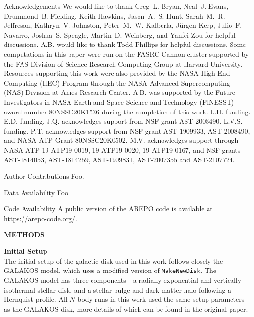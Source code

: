 \documentclass{natureprintstyle}
\newcommand{\Nbody}{$N$-body}
\begin{document}
\begin{addendum}
  
\item [Acknowledgements] We would like to thank Greg~L. Bryan, Neal~J. Evans,
Drummond~B. Fielding, Keith Hawkins, Jason~A.~S. Hunt, Sarah~M.~R. Jeffreson,
Kathryn~V. Johnston, Peter~M.~W. Kalberla, Jürgen Kerp, Julio~F. Navarro,
Joshua~S. Speagle, Martin~D. Weinberg, and Yanfei Zou for helpful discussions.
A.B. would like to thank Todd Phillips for helpful discussions. Some
computations in this paper were run on the FASRC Cannon cluster supported by
the FAS Division of Science Research Computing Group at Harvard University.
Resources supporting this work were also provided by the NASA High-End
Computing (HEC) Program through the NASA Advanced Supercomputing (NAS)
Division at Ames Research Center. A.B. was supported by the Future
Investigators in NASA Earth and Space Science and Technology (FINESST) award
number 80NSSC20K1536 during the completion of this work. L.H. funding. E.D.
funding. J.Q. acknowledges support from NSF grant
AST-2008490. L.V.S. funding. P.T. acknowledges support from NSF grant
AST-1909933, AST-2008490, and NASA ATP Grant 80NSSC20K0502. M.V. acknowledges
support through NASA ATP 19-ATP19-0019, 19-ATP19-0020, 19-ATP19-0167, and NSF
grants AST-1814053, AST-1814259, AST-1909831, AST-2007355 and AST-2107724.

\item[Author Contributions] Foo.

  \item[Data Availability] Foo.
    
  \item[Code Availability] A public version of the AREPO code is available at
  \url{https://arepo-code.org/}.
    
\end{addendum}



\FloatBarrier
\clearpage

\setcounter{page}{1}
\setcounter{figure}{0}
\setcounter{table}{0}
\renewcommand{\figurename}{Extended Data Figure}
\renewcommand{\thetable}{Extended Data \arabic{table}}

\noindent
{\bf \Large \uppercase{Methods} }

\bigskip

\noindent
{\bf Initial Setup}
\\
\noindent
The initial setup of the galactic disk used in this work follows closely the
GALAKOS model\cite{2020ApJ...890..117D}, which uses a modified version of
\texttt{MakeNewDisk}.\cite{2005MNRAS.361..776S} The GALAKOS model has three
components - a radially exponential and vertically isothermal stellar disk,
and a stellar bulge and dark matter halo following a Hernquist
profile.\cite{1990ApJ...356..359H} All \Nbody{} runs in this work used the same
setup parameters as the GALAKOS disk, more details of which can be found in
the original paper.
\end{document}
